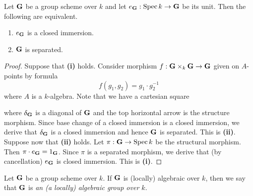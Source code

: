 \begin{proposition}\label{proposition:separatedness_criterion}
Let $\mathbf{G}$ be a group scheme over $k$ and let $e_{\mathbf{G}}:\mathrm{Spec}\, k\rightarrow \mathbf{G}$ be its unit. Then the following are equivalent.
\begin{enumerate}[label=\emph{\textbf{(\roman*)}}, leftmargin=3.0em]
\item $e_{\mathbf{G}}$ is a closed immersion.
\item $\mathbf{G}$ is separated.
\end{enumerate}
\end{proposition}
\begin{proof}
Suppose that \textbf{(i)} holds. Consider morphism $f:\mathbf{G}\times_k\mathbf{G}\rightarrow \mathbf{G}$ given on $A$-points by formula
$$f(g_1,g_2) = g_1\cdot g_2^{-1}$$
where $A$ is a $k$-algebra. Note that we have a cartesian square
\begin{center}
\end{center}
where $\delta_{\mathbf{G}}$ is a diagonal of $\mathbf{G}$ and the top horizontal arrow is the structure morphism. Since base change of a closed immersion is a closed immersion, we derive that $\delta_{\mathbf{G}}$ is a closed immersion and hence $\mathbf{G}$ is separated. This is \textbf{(ii)}.\\
Suppose now that \textbf{(ii)} holds. Let $\pi:\mathbf{G}\rightarrow \mathrm{Spec}\, k$ be the structural morphism. Then $\pi\cdot e_{\mathbf{G}} = 1_{\mathbf{G}}$. Since $\pi$ is a separated morphism, we derive that (by cancellation) $e_{\mathbf{G}}$ is closed immersion. This is \textbf{(i)}.
\end{proof}

\begin{definition}
Let $\mathbf{G}$ be a group scheme over $k$. If $\mathbf{G}$ is (locally) algebraic over $k$, then we say that $\mathbf{G}$ is \textit{an (a locally) algebraic group over $k$}.
\end{definition}


